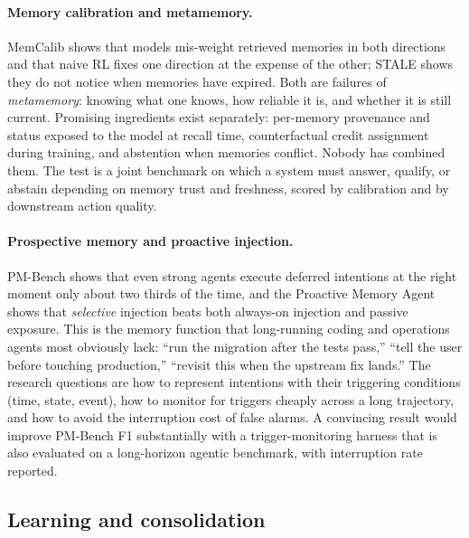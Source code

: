 \documentclass[11pt]{article}
\begin{document}
\paragraph{Memory calibration and metamemory.}
MemCalib \citep{cao2026memcalib} shows that models mis-weight retrieved memories in both directions and that naive RL fixes one direction at the expense of the other; STALE \citep{chao2026stale} shows they do not notice when memories have expired. Both are failures of \emph{metamemory}: knowing what one knows, how reliable it is, and whether it is still current. Promising ingredients exist separately: per-memory provenance and status exposed to the model at recall time, counterfactual credit assignment during training, and abstention when memories conflict. Nobody has combined them. The test is a joint benchmark on which a system must answer, qualify, or abstain depending on memory trust and freshness, scored by calibration and by downstream action quality.

\paragraph{Prospective memory and proactive injection.}
PM-Bench \citep{liu2026pmbench} shows that even strong agents execute deferred intentions at the right moment only about two thirds of the time, and the Proactive Memory Agent \citep{wu2026proactive} shows that \emph{selective} injection beats both always-on injection and passive exposure. This is the memory function that long-running coding and operations agents most obviously lack: ``run the migration after the tests pass,'' ``tell the user before touching production,'' ``revisit this when the upstream fix lands.'' The research questions are how to represent intentions with their triggering conditions (time, state, event), how to monitor for triggers cheaply across a long trajectory, and how to avoid the interruption cost of false alarms. A convincing result would improve PM-Bench F1 substantially with a trigger-monitoring harness that is also evaluated on a long-horizon agentic benchmark, with interruption rate reported.

\subsection{Learning and consolidation}
\end{document}
